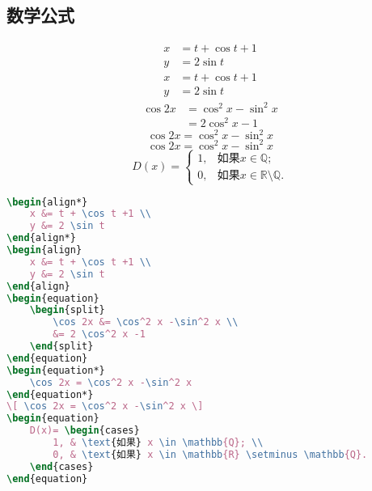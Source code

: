 \subsection{数学公式}
\begin{align*}
	x &= t + \cos t +1 \\
	y &= 2 \sin t
\end{align*}
\begin{align}
	x &= t + \cos t +1 \\
	y &= 2 \sin t
\end{align}
\begin{equation}
	\begin{split}
		\cos 2x &= \cos^2 x -\sin^2 x \\
		&= 2 \cos^2 x -1
	\end{split}
\end{equation}
\begin{equation*}
	\cos 2x = \cos^2 x -\sin^2 x 
\end{equation*}
\[ \cos 2x = \cos^2 x -\sin^2 x \]
\begin{equation}
D(x)= \begin{cases}
		1, & \text{如果} x \in \mathbb{Q}; \\
		0, & \text{如果} x \in \mathbb{R} \setminus \mathbb{Q}.
	\end{cases}
\end{equation}
\begin{lstlisting}[language=TeX]
\begin{align*}
	x &= t + \cos t +1 \\
	y &= 2 \sin t
\end{align*}
\begin{align}
	x &= t + \cos t +1 \\
	y &= 2 \sin t
\end{align}
\begin{equation}
	\begin{split}
		\cos 2x &= \cos^2 x -\sin^2 x \\
		&= 2 \cos^2 x -1
	\end{split}
\end{equation}
\begin{equation*}
	\cos 2x = \cos^2 x -\sin^2 x 
\end{equation*}
\[ \cos 2x = \cos^2 x -\sin^2 x \]
\begin{equation}
	D(x)= \begin{cases}
		1, & \text{如果} x \in \mathbb{Q}; \\
		0, & \text{如果} x \in \mathbb{R} \setminus \mathbb{Q}.
	\end{cases}
\end{equation}
\end{lstlisting}
